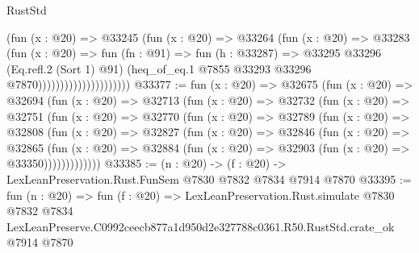 \begin{lexlean}{RustStd}
\begin{coremodule}
                                    (fun (x : @20) =>
                                    @33245
                                      (fun (x : @20) =>
                                      @33264
                                        (fun (x : @20) =>
                                        @33283
                                          (fun (x : @20) =>
                                          fun (fn : @91) =>
                                          fun (h : @33287) =>
                                          @33295
                                            @33296
                                            (Eq.refl.{2} (Sort 1) @91)
                                            (heq_of_eq.{1}
                                              @7855
                                              @33293
                                              @33296
                                              @7870)))))))))))))))))))))
@33377 := fun (x : @20) =>
  @32675
    (fun (x : @20) =>
    @32694
      (fun (x : @20) =>
      @32713
        (fun (x : @20) =>
        @32732
          (fun (x : @20) =>
          @32751
            (fun (x : @20) =>
            @32770
              (fun (x : @20) =>
              @32789
                (fun (x : @20) =>
                @32808
                  (fun (x : @20) =>
                  @32827
                    (fun (x : @20) =>
                    @32846
                      (fun (x : @20) =>
                      @32865
                        (fun (x : @20) =>
                        @32884 (fun (x : @20) => @32903 (fun (x : @20) => @33350)))))))))))))
@33385 := (n : @20) -> (f : @20) -> LexLeanPreservation.Rust.FunSem @7830 @7832 @7834 @7914 @7870
@33395 := fun (n : @20) =>
  fun (f : @20) =>
  LexLeanPreservation.Rust.simulate
    @7830
    @7832
    @7834
    LexLeanPreserve.C0992ceecb877a1d950d2e327788c0361.R50.RustStd.crate_ok
    @7914
    @7870
\end{coremodule}
\end{lexlean}
